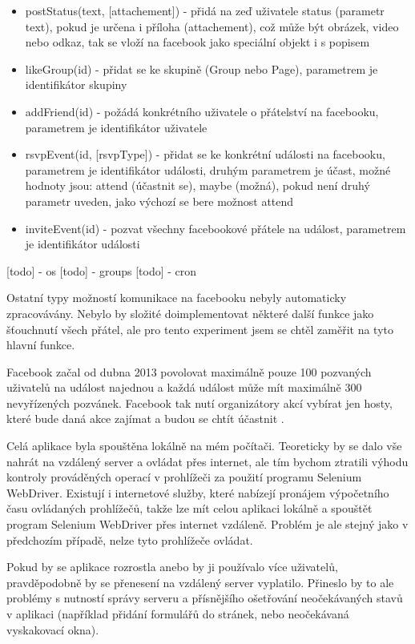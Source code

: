 \documentclass[thesis=M,czech]{FITthesis}[2013/05/10]
\begin{document}
\begin{itemize}
  \item postStatus(text, [attachement]) - přidá na zeď uživatele status (parametr text), pokud je určena i příloha (attachement), což může být obrázek, video nebo odkaz, tak se vloží na facebook jako speciální objekt i s popisem
  \item likeGroup(id) - přidat se ke skupině (Group nebo Page), parametrem je identifikátor skupiny 
  \item addFriend(id) - požádá konkrétního uživatele o přátelství na facebooku, parametrem je identifikátor uživatele
  \item rsvpEvent(id, [rsvpType]) - přidat se ke konkrétní události na facebooku, parametrem je identifikátor události, druhým parametrem je účast, možné hodnoty jsou: attend (účastnit se), maybe (možná), pokud není druhý parametr uveden, jako výchozí se bere možnost attend
  \item inviteEvent(id) - pozvat všechny facebookové přátele na událost, parametrem je identifikátor události
\end{itemize}
[todo] - os
[todo] - groups
[todo] - cron

Ostatní typy možností komunikace na facebooku nebyly automaticky zpracovávány. Nebylo by složité doimplementovat některé další funkce jako šťouchnutí všech přátel, ale pro tento experiment jsem se chtěl zaměřit na tyto hlavní funkce. 

Facebook začal od dubna 2013 povolovat maximálně pouze 100 pozvaných uživatelů na událost najednou a každá událost může mít maximálně 300 nevyřízených pozvánek. Facebook tak nutí organizátory akcí vybírat jen hosty, které bude daná akce zajímat a budou se chtít účastnit \cite{web:fbEventsLimit} \cite{web:fbEventsLimitHelpCenter}.

Celá aplikace byla spouštěna lokálně na mém počítači. Teoreticky by se dalo vše nahrát na vzdálený server a ovládat přes internet, ale tím bychom ztratili výhodu kontroly prováděných operací v prohlížeči za použití programu Selenium WebDriver. Existují i internetové služby, které nabízejí pronájem výpočetního času ovládaných prohlížečů, takže lze mít celou aplikaci lokálně a spouštět program Selenium WebDriver přes internet vzdáleně. Problém je ale stejný jako v předchozím případě, nelze tyto prohlížeče ovládat.

Pokud by se aplikace rozrostla anebo by ji používalo více uživatelů, pravděpodobně by se přenesení na vzdálený server vyplatilo. Přineslo by to ale problémy s nutností správy serveru a přísnějšího ošetřování neočekávaných stavů v aplikaci (například přidání formulářů do stránek, nebo neočekávaná vyskakovací okna).
\end{document}
